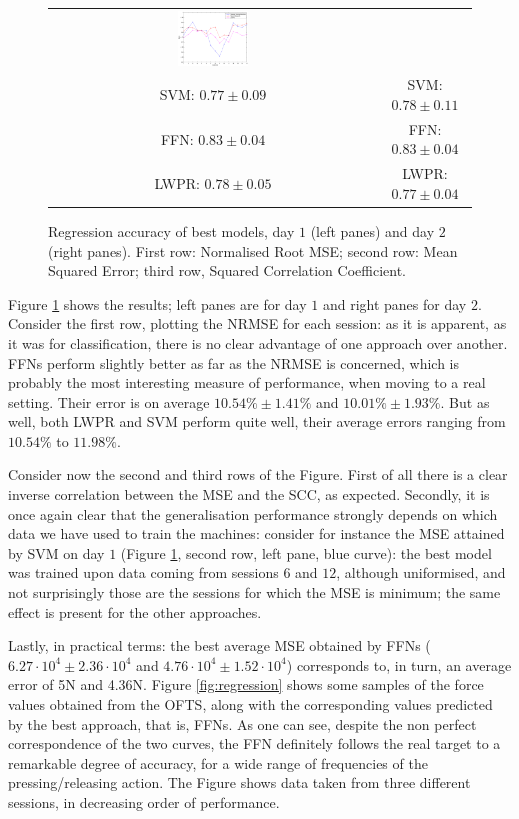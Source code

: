 \begin{figure}[!ht]
\begin{tabular}{cc}
    \includegraphics[width=0.22\textwidth]{figs/fig_SCC_regr_resCrossBestOnDay2} \\
     SVM: $0.77 \pm 0.09$ &  SVM: $0.78 \pm 0.11$ \\
     FFN: $0.83 \pm 0.04$ &  FFN: $0.83 \pm 0.04$ \\
    LWPR: $0.78 \pm 0.05$ & LWPR: $0.77 \pm 0.04$ \\
  \end{tabular}
  \caption{Regression accuracy of best models, day $1$ (left panes)
    and day $2$ (right panes). First row: Normalised Root MSE; second
    row: Mean Squared Error; third row, Squared Correlation Coefficient.}
  \label{fig:best_regr}
\end{figure}

Figure \ref{fig:best_regr} shows the results; left panes are for day
$1$ and right panes for day $2$. Consider the first row, plotting the
NRMSE for each session: as it is apparent, as it was for
classification, there is no clear advantage of one approach over
another. FFNs perform slightly better as far as the NRMSE is concerned,
which is probably the most interesting measure of performance, when
moving to a real setting. Their error is on average $10.54\% \pm
1.41\%$ and $10.01\% \pm 1.93\%$. But as well, both LWPR and SVM
perform quite well, their average errors ranging from $10.54\%$ to
$11.98\%$.

Consider now the second and third rows of the Figure. First of all
there is a clear inverse correlation between the MSE and the SCC, as
expected. Secondly, it is once again clear that the generalisation
performance strongly depends on which data we have used to train the
machines: consider for instance the MSE attained by SVM on day $1$
(Figure \ref{fig:best_regr}, second row, left pane, blue curve): the
best model was trained upon data coming from sessions $6$ and $12$,
although uniformised, and not surprisingly those are the sessions for
which the MSE is minimum; the same effect is present for the other
approaches.

Lastly, in practical terms: the best average MSE obtained by FFNs
($6.27\cdot 10^4 \pm 2.36\cdot 10^4$ and $4.76\cdot 10^4 \pm 1.52\cdot
10^4$) corresponds to, in turn, an average error of 5N and
4.36N. Figure \ref{fig:regression} shows some samples of the force
values obtained from the OFTS, along with the corresponding values
predicted by the best approach, that is, FFNs. As one can see, despite
the non perfect correspondence of the two curves, the FFN definitely
follows the real target to a remarkable degree of accuracy, for a wide
range of frequencies of the pressing/releasing action. The Figure
shows data taken from three different sessions, in decreasing order of
performance.

